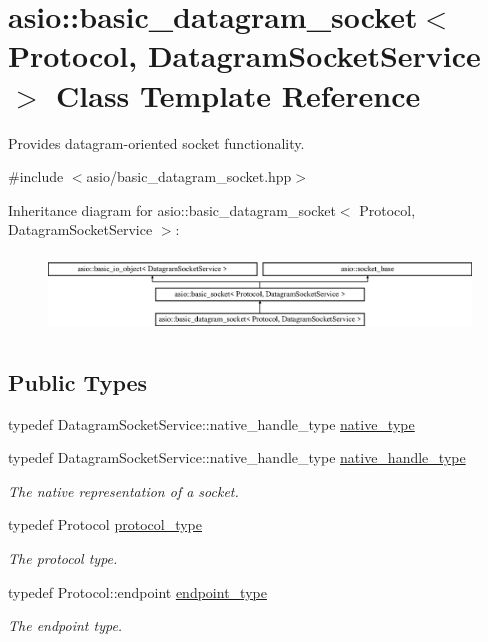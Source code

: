 \hypertarget{classasio_1_1basic__datagram__socket}{}\section{asio\+:\+:basic\+\_\+datagram\+\_\+socket$<$ Protocol, Datagram\+Socket\+Service $>$ Class Template Reference}
\label{classasio_1_1basic__datagram__socket}


Provides datagram-\/oriented socket functionality.  




{\ttfamily \#include $<$asio/basic\+\_\+datagram\+\_\+socket.\+hpp$>$}

Inheritance diagram for asio\+:\+:basic\+\_\+datagram\+\_\+socket$<$ Protocol, Datagram\+Socket\+Service $>$\+:\begin{figure}[H]
\begin{center}
\leavevmode
\includegraphics[height=2.115869cm]{classasio_1_1basic__datagram__socket}
\end{center}
\end{figure}
\subsection*{Public Types}
\begin{DoxyCompactItemize}
\item 
typedef Datagram\+Socket\+Service\+::native\+\_\+handle\+\_\+type \hyperlink{classasio_1_1basic__datagram__socket_ac8d4527707418c54b614980272cfa2fb}{native\+\_\+type}
\item 
typedef Datagram\+Socket\+Service\+::native\+\_\+handle\+\_\+type \hyperlink{classasio_1_1basic__datagram__socket_a6e056acde4635471987bd2e39024d39c}{native\+\_\+handle\+\_\+type}
\begin{DoxyCompactList}\small\item\em The native representation of a socket. \end{DoxyCompactList}\item 
typedef Protocol \hyperlink{classasio_1_1basic__datagram__socket_ab65a458559daaa97ef48f6ee8ce46276}{protocol\+\_\+type}
\begin{DoxyCompactList}\small\item\em The protocol type. \end{DoxyCompactList}\item 
typedef Protocol\+::endpoint \hyperlink{classasio_1_1basic__datagram__socket_af952c8d18c85588a16531cfc54a172bb}{endpoint\+\_\+type}
\begin{DoxyCompactList}\small\item\em The endpoint type. \end{DoxyCompactList}\end{DoxyCompactItemize}
